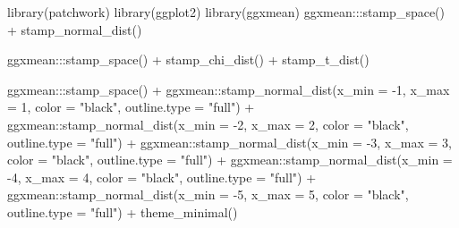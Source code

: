\documentclass[12pt]{article}
\newenvironment{Shaded}{\begin{snugshade}}{\end{snugshade}}
\newcommand{\AttributeTok}[1]{\textcolor[rgb]{0.77,0.63,0.00}{#1}}
\newcommand{\DecValTok}[1]{\textcolor[rgb]{0.00,0.00,0.81}{#1}}
\newcommand{\FunctionTok}[1]{\textcolor[rgb]{0.00,0.00,0.00}{#1}}
\newcommand{\NormalTok}[1]{#1}
\newcommand{\SpecialCharTok}[1]{\textcolor[rgb]{0.00,0.00,0.00}{#1}}
\newcommand{\StringTok}[1]{\textcolor[rgb]{0.31,0.60,0.02}{#1}}
\begin{document}
\begin{Shaded}
\begin{Highlighting}[]
\FunctionTok{library}\NormalTok{(patchwork)}
\FunctionTok{library}\NormalTok{(ggplot2)}
\FunctionTok{library}\NormalTok{(ggxmean)}
\NormalTok{ggxmean}\SpecialCharTok{:::}\FunctionTok{stamp\_space}\NormalTok{() }\SpecialCharTok{+}
  \FunctionTok{stamp\_normal\_dist}\NormalTok{()}

\NormalTok{ggxmean}\SpecialCharTok{:::}\FunctionTok{stamp\_space}\NormalTok{() }\SpecialCharTok{+}
  \FunctionTok{stamp\_chi\_dist}\NormalTok{() }\SpecialCharTok{+} 
  \FunctionTok{stamp\_t\_dist}\NormalTok{()}

\NormalTok{ggxmean}\SpecialCharTok{:::}\FunctionTok{stamp\_space}\NormalTok{() }\SpecialCharTok{+}
\NormalTok{  ggxmean}\SpecialCharTok{::}\FunctionTok{stamp\_normal\_dist}\NormalTok{(}\AttributeTok{x\_min =} \SpecialCharTok{{-}}\DecValTok{1}\NormalTok{, }\AttributeTok{x\_max =} \DecValTok{1}\NormalTok{, }\AttributeTok{color =} \StringTok{"black"}\NormalTok{, }\AttributeTok{outline.type =} \StringTok{"full"}\NormalTok{) }\SpecialCharTok{+}
\NormalTok{  ggxmean}\SpecialCharTok{::}\FunctionTok{stamp\_normal\_dist}\NormalTok{(}\AttributeTok{x\_min =} \SpecialCharTok{{-}}\DecValTok{2}\NormalTok{, }\AttributeTok{x\_max =} \DecValTok{2}\NormalTok{, }\AttributeTok{color =} \StringTok{"black"}\NormalTok{, }\AttributeTok{outline.type =} \StringTok{"full"}\NormalTok{) }\SpecialCharTok{+}
\NormalTok{  ggxmean}\SpecialCharTok{::}\FunctionTok{stamp\_normal\_dist}\NormalTok{(}\AttributeTok{x\_min =} \SpecialCharTok{{-}}\DecValTok{3}\NormalTok{, }\AttributeTok{x\_max =} \DecValTok{3}\NormalTok{, }\AttributeTok{color =} \StringTok{"black"}\NormalTok{, }\AttributeTok{outline.type =} \StringTok{"full"}\NormalTok{) }\SpecialCharTok{+}
\NormalTok{  ggxmean}\SpecialCharTok{::}\FunctionTok{stamp\_normal\_dist}\NormalTok{(}\AttributeTok{x\_min =} \SpecialCharTok{{-}}\DecValTok{4}\NormalTok{, }\AttributeTok{x\_max =} \DecValTok{4}\NormalTok{, }\AttributeTok{color =} \StringTok{"black"}\NormalTok{, }\AttributeTok{outline.type =} \StringTok{"full"}\NormalTok{) }\SpecialCharTok{+}
\NormalTok{  ggxmean}\SpecialCharTok{::}\FunctionTok{stamp\_normal\_dist}\NormalTok{(}\AttributeTok{x\_min =} \SpecialCharTok{{-}}\DecValTok{5}\NormalTok{, }\AttributeTok{x\_max =} \DecValTok{5}\NormalTok{, }\AttributeTok{color =} \StringTok{"black"}\NormalTok{, }\AttributeTok{outline.type =} \StringTok{"full"}\NormalTok{) }\SpecialCharTok{+}
  \FunctionTok{theme\_minimal}\NormalTok{()}
\end{Highlighting}
\end{Shaded}
\end{document}
